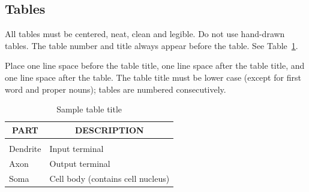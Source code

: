 \documentclass{article} %
\begin{document}
\subsection{Tables}

All tables must be centered, neat, clean and legible. Do not use hand-drawn
tables. The table number and title always appear before the table. See
Table~\ref{sample-table}.

Place one line space before the table title, one line space after the table
title, and one line space after the table. The table title must be lower case
(except for first word and proper nouns); tables are numbered consecutively.

\begin{table}[t]
\caption{Sample table title}
\label{sample-table}
\begin{center}
\begin{tabular}{ll}
\multicolumn{1}{c}{\bf PART}  &\multicolumn{1}{c}{\bf DESCRIPTION}
\\ \hline \\
Dendrite         &Input terminal \\
Axon             &Output terminal \\
Soma             &Cell body (contains cell nucleus) \\
\end{tabular}
\end{center}
\end{table}
%
%
%
%
%
\end{document}
